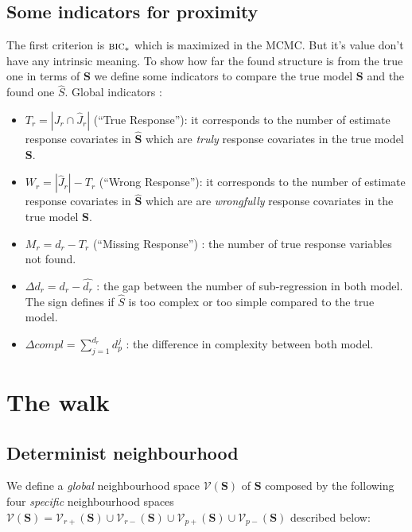 \documentclass[12pt,a4paper]{report}
\begin{document}
		\subsection{Some indicators for proximity}
		The first criterion is $\mbox{{\sc bic}}_*$ which is maximized in the MCMC. But it's value don't have any intrinsic meaning. To show how far the found structure is from the true one in terms of $\boldsymbol{S}$ we define some indicators to compare the true model $\boldsymbol{S}$ and the found one $\hat{S}$.
			Global indicators :
			\begin{itemize}
				\item $T_r=|J_r \cap \hat{J}_r|$ (``True Response''): it corresponds to the number of estimate response covariates in $\hat{\boldsymbol{S}}$ which are {\it truly} response covariates in the true model $\boldsymbol{S}$.
				\item $W_r=|\hat{J}_r|-T_r$ (``Wrong Response''): it corresponds to the number of estimate response covariates in $\hat{\boldsymbol{S}}$ which are are {\it wrongfully} response covariates in the true model $\boldsymbol{S}$.
				\item $M_r=d_r-T_r$ (``Missing Response'') : the number of true response variables not found.
				\item $\Delta d_r=d_r-\hat{d_r}$ : the gap between the number of sub-regression in both model. The sign defines if $\hat{S}$ is too complex or too simple compared to the true model.
				\item $\Delta compl=\sum_{j=1}^{d_r}d_p^j$ : the difference in complexity between both model.
			\end{itemize}

			
			
	\section{The walk}
		\subsection{Determinist neighbourhood}
	
We define a {\it global} neighbourhood space $\mathcal{V}(\boldsymbol{S})$ of $\boldsymbol{S}$ composed by the following four {\it specific} neighbourhood spaces $\mathcal{V}(\boldsymbol{S})=\mathcal{V}_{r+}(\boldsymbol{S})\cup\mathcal{V}_{r-}(\boldsymbol{S})\cup\mathcal{V}_{p+}(\boldsymbol{S})\cup\mathcal{V}_{p-}(\boldsymbol{S})$ described below:
\end{document}
